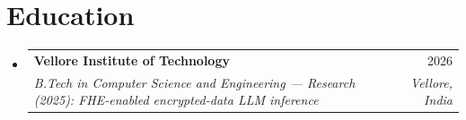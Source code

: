 \documentclass[a4paper,10pt]{article}
\makeatletter
\newcommand{\resumeItem}[1]{
  \item\small{{#1 \vspace{-2pt}}}
}
\newcommand{\resumeSubheading}[4]{
  \vspace{-2pt}\item
    \begin{tabular*}{\textwidth}{l@{\extracolsep{\fill}}r}
      \textbf{#1} & #2 \\
      \textit{\small#3} & \textit{\small #4} \\
    \end{tabular*}\vspace{-7pt}
}
\newcommand{\resumeSubHeadingListStart}{\begin{itemize}[leftmargin=0.15in, label={}, noitemsep, topsep=0pt, parsep=0pt]}
\newcommand{\resumeSubHeadingListEnd}{\end{itemize}}
\newcommand{\resumeItemListStart}{\begin{itemize}\setlength{\itemsep}{0pt}\setlength{\parsep}{0pt}\setlength{\topsep}{0pt}\setlength{\partopsep}{0pt}}
\newcommand{\resumeItemListEnd}{\end{itemize}\vspace{-5pt}}
\makeatother
\begin{document}

\section{Education}
  \resumeSubHeadingListStart
    \resumeSubheading
      {Vellore Institute of Technology}{2026}
      {B.Tech in Computer Science and Engineering --- Research (2025): FHE-enabled encrypted-data LLM inference}{Vellore, India}
  \resumeSubHeadingListEnd
\end{document}
